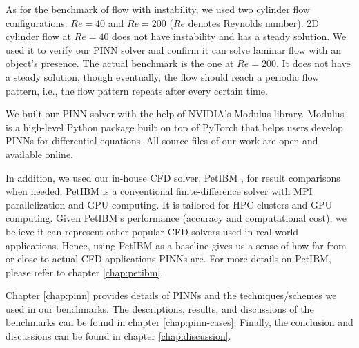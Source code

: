 As for the benchmark of flow with instability, we used two cylinder flow configurations: $Re=40$ and $Re=200$ ($Re$ denotes Reynolds number).
2D cylinder flow at $Re=40$ does not have instability and has a steady solution.
We used it to verify our PINN solver and confirm it can solve laminar flow with an object's presence.
The actual benchmark is the one at $Re=200$.
It does not have a steady solution, though eventually, the flow should reach a periodic flow pattern, i.e., the flow pattern repeats after every certain time.

We built our PINN solver with the help of NVIDIA's Modulus library.
Modulus is a high-level Python package built on top of PyTorch that helps users develop PINNs for differential equations.
All source files of our work are open and available online.

In addition, we used our in-house CFD solver, PetIBM \cite{chuang_petibm:_2018}, for result comparisons when needed.
PetIBM is a conventional finite-difference solver with MPI parallelization and GPU computing.
It is tailored for HPC clusters and GPU computing.
Given PetIBM's performance (accuracy and computational cost), we believe it can represent other popular CFD solvers used in real-world applications.
Hence, using PetIBM as a baseline gives us a sense of how far from or close to actual CFD applications PINNs are.
For more details on PetIBM, please refer to chapter \ref{chap:petibm}.

Chapter \ref{chap:pinn} provides details of PINNs and the techniques/schemes we used in our benchmarks.
The descriptions, results, and discussions of the benchmarks can be found in chapter \ref{chap:pinn-cases}.
Finally, the conclusion and discussions can be found in chapter \ref{chap:discussion}.

